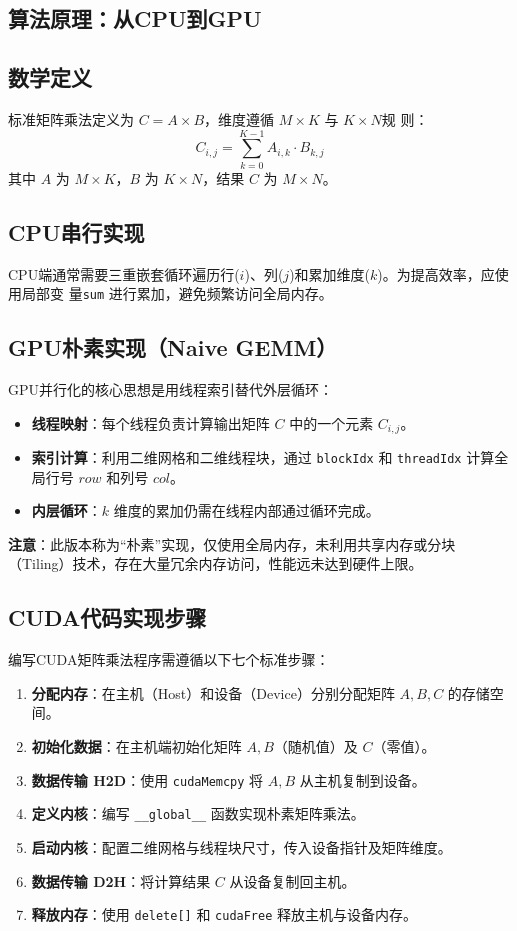 \subsection{算法原理：从CPU到GPU}

\subsection{数学定义}
标准矩阵乘法定义为 $C = A \times B$，维度遵循 $M \times K$ 与 $K \times N$规
则：\[C_{i,j} = \sum_{k=0}^{K-1} A_{i,k} \cdot B_{k,j}\]其中 $A$
为 $M \times K$，$B$ 为 $K \times N$，结果 $C$ 为 $M \times N$。

\subsection{CPU串行实现}
CPU端通常需要三重嵌套循环遍历行($i$)、列($j$)和累加维度($k$)。为提高效率，应使用局部变
量\texttt{sum} 进行累加，避免频繁访问全局内存。

\subsection{GPU朴素实现（Naive GEMM）}
GPU并行化的核心思想是用线程索引替代外层循环：
\begin{itemize}
    \item \textbf{线程映射}：每个线程负责计算输出矩阵 $C$ 中的一个元素 $C_{i,j}$。
    \item \textbf{索引计算}：利用二维网格和二维线程块，通过 \texttt{blockIdx} 和 \texttt{threadIdx} 计算全局行号 $row$ 和列号 $col$。
    \item \textbf{内层循环}：$k$ 维度的累加仍需在线程内部通过循环完成。
\end{itemize}

\noindent \textbf{注意}：此版本称为“朴素”实现，仅使用全局内存，未利用共享内存或分块（Tiling）技术，存在大量冗余内存访问，性能远未达到硬件上限。

\subsection{CUDA代码实现步骤}

编写CUDA矩阵乘法程序需遵循以下七个标准步骤：

\begin{enumerate}
    \item \textbf{分配内存}：在主机（Host）和设备（Device）分别分配矩阵 $A, B, C$ 的存储空间。
    \item \textbf{初始化数据}：在主机端初始化矩阵 $A, B$（随机值）及 $C$（零值）。
    \item \textbf{数据传输 H2D}：使用 \texttt{cudaMemcpy} 将 $A, B$ 从主机复制到设备。
    \item \textbf{定义内核}：编写 \texttt{\_\_global\_\_} 函数实现朴素矩阵乘法。
    \item \textbf{启动内核}：配置二维网格与线程块尺寸，传入设备指针及矩阵维度。
    \item \textbf{数据传输 D2H}：将计算结果 $C$ 从设备复制回主机。
    \item \textbf{释放内存}：使用 \texttt{delete[]} 和 \texttt{cudaFree} 释放主机与设备内存。
\end{enumerate}

